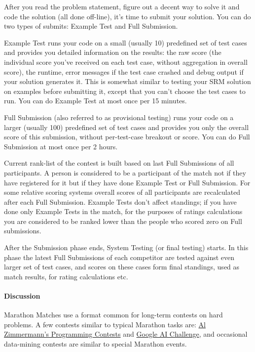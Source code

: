 \documentclass[]{article}
\let\oldparagraph\paragraph
\renewcommand{\paragraph}[1]{\oldparagraph{#1}\mbox{}}
\begin{document}
After you read the problem statement, figure out a decent way to solve
it and code the solution (all done off-line), it's time to submit your
solution. You can do two types of submits: Example Test and Full
Submission.

Example Test runs your code on a small (usually 10) predefined set of
test cases and provides you detailed information on the results: the raw
score (the individual score you've received on each test case, without
aggregation in overall score), the runtime, error messages if the test
case crashed and debug output if your solution generates it. This is
somewhat similar to testing your SRM solution on examples before
submitting it, except that you can't choose the test cases to run. You
can do Example Test at most once per 15 minutes.

Full Submission (also referred to as provisional testing) runs your code
on a larger (usually 100) predefined set of test cases and provides you
only the overall score of this submission, without per-test-case
breakout or score. You can do Full Submission at most once per 2 hours.

Current rank-list of the contest is built based on last Full Submissions
of all participants. A person is considered to be a participant of the
match not if they have registered for it but if they have done Example
Test or Full Submission. For some relative scoring systems overall
scores of all participants are recalculated after each Full Submission.
Example Tests don't affect standings; if you have done only Example
Tests in the match, for the purposes of ratings calculations you are
considered to be ranked lower than the people who scored zero on Full
submissions.

After the Submission phase ends, System Testing (or final testing)
starts. In this phase the latest Full Submissions of each competitor are
tested against even larger set of test cases, and scores on these cases
form final standings, used as match results, for rating calculations
etc.

\hypertarget{discussion}{%
\paragraph{Discussion}\label{discussion}}

Marathon Matches use a format common for long-term contests on hard
problems. A few contests similar to typical Marathon tasks are:
\href{http://azspcs.com}{Al Zimmermann's Programming Contests} and
\href{http://aichallenge.org}{Google AI Challenge}, and occasional
data-mining contests are similar to special Marathon events.
\end{document}
